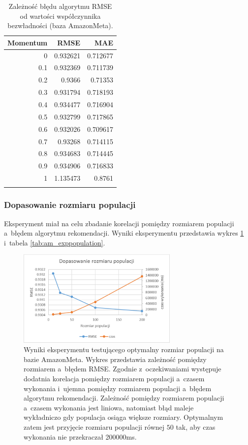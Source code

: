 \documentclass[twoside]{iisthesis}
\begin{document}
			\begin{longtable}{r||rr}
				\label{tab:am_expmomentum}
				\textbf{Momentum} & \textbf{RMSE} & \textbf{MAE} \\
				\hline
				0   & 0.932621 & 0.712677 \\
				0.1 & 0.932369 & 0.711739 \\
				0.2 & 0.9366   & 0.71353  \\
				0.3 & 0.931794 & 0.718193 \\
				0.4 & 0.934477 & 0.716904 \\
				0.5 & 0.932799 & 0.717865 \\
				0.6 & 0.932026 & 0.709617 \\
				0.7 & 0.93268  & 0.714115 \\
				0.8 & 0.934683 & 0.714445 \\
				0.9 & 0.934906 & 0.716833 \\
				1   & 1.135473 & 0.8761   \\
				\caption{Zależność błędu algorytmu RMSE od wartości współczynnika bezwładności (baza AmazonMeta).}
			\end{longtable}
			
			\subsubsection{Dopasowanie rozmiaru populacji}
			
			 Eksperyment miał na celu zbadanie korelacji pomiędzy rozmiarem populacji a~błędem algorytmu rekomendacji. Wyniki eksperymentu przedstawia wykres \ref{fig:am_exppopulation} i~tabela \ref{tab:am_exppopulation}. 
			 
			 \begin{figure}[!ht]
			 	\centering
			 	\includegraphics[width=0.7\textwidth]{am_exppopulation}
			 	\caption{Wyniki eksperymentu testującego optymalny rozmiar populacji na bazie AmazonMeta. Wykres przedstawia zależność pomiędzy rozmiarem a~błędem RMSE. 
		 		Zgodnie z~oczekiwaniami występuje dodatnia korelacja pomiędzy rozmiarem populacji a~czasem wykonania i~ujemna pomiędzy rozmiarem populacji a~błędem algorytmu rekomendacji. 
		 		Zależność pomiędzy rozmiarem populacji a~czasem wykonania  jest liniowa, natomiast błąd maleje wykładniczo gdy populacja osiąga większe rozmiary. Optymalnym zatem jest przyjęcie rozmiaru populacji równej $50$ tak, aby czas wykonania nie przekraczał 200000ms.}
			 	\label{fig:am_exppopulation}
			 \end{figure}
			
\end{document}
